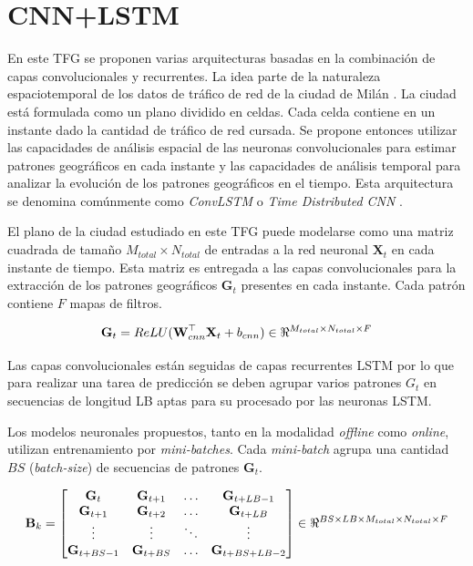 \section{CNN+LSTM}
En este TFG se proponen varias arquitecturas basadas en la combinación de capas convolucionales y recurrentes. La idea parte de la naturaleza espaciotemporal de los datos de tráfico de red de la ciudad de Milán \cite{milandataset}. La ciudad está formulada como un plano dividido en celdas. Cada celda contiene en un instante dado la cantidad de tráfico de red cursada. Se propone entonces utilizar las capacidades de análisis espacial de las neuronas convolucionales para estimar patrones geográficos en cada instante y las capacidades de análisis temporal para analizar la evolución de los patrones geográficos en el tiempo. Esta arquitectura se denomina comúnmente como \textit{ConvLSTM} o \textit{Time Distributed CNN} \cite{cnnlstm,timedistributed}.

El plano de la ciudad estudiado en este TFG \cite{milanogrid} puede modelarse como una matriz cuadrada de tamaño $M_{total} \times N_{total}$ de entradas a la red neuronal $\textbf{X}_t$ en cada instante de tiempo. Esta matriz es entregada a las capas convolucionales para la extracción de los patrones geográficos $\textbf{G}_t$ presentes en cada instante. Cada patrón contiene $F$ mapas de filtros.

\begin{equation}
	\textbf{G}_t = ReLU(\textbf{W}_{cnn}^\top \textbf{X}_t + b_{cnn}) \in \real^{M_{total}\times N_{total}\times F}
\end{equation}

Las capas convolucionales están seguidas de capas recurrentes LSTM por lo que para realizar una tarea de predicción se deben agrupar varios patrones $G_t$ en secuencias de longitud LB aptas para su procesado por las neuronas LSTM. 

Los modelos neuronales propuestos, tanto en la modalidad \textit{offline} como \textit{online}, utilizan entrenamiento por \textit{mini-batches}. Cada \textit{mini-batch} agrupa una cantidad $BS$ (\textit{batch-size}) de secuencias de patrones $\textbf{G}_t$.

\begin{equation}
	\mathbf{B}_k = 
	\begin{bmatrix}
		\mathbf{G}_t     & \mathbf{G}_{t+1}   & \dots  & \mathbf{G}_{t+LB-1} \\
		\mathbf{G}_{t+1} & \mathbf{G}_{t+2}   & \dots  & \mathbf{G}_{t+LB}   \\
		\vdots           & \vdots             & \ddots & \vdots               \\
		\mathbf{G}_{t+BS-1} & \mathbf{G}_{t+BS} & \dots  & \mathbf{G}_{t+BS+LB-2}
	\end{bmatrix} 
	\in \real^{BS\times LB\times M_{total}\times N_{total}\times F}
	\label{eq35}
\end{equation}


